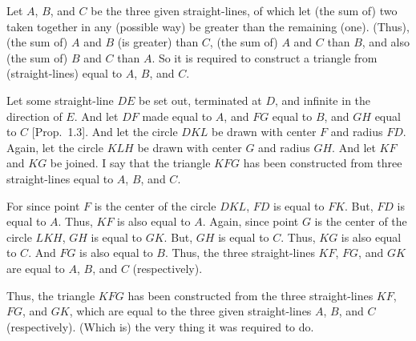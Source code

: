 \begin{Parallel}{}{}
{\epsfysize=2.3in
\centerline{}

Let $A$, $B$, and $C$ be the three given straight-lines, of which let (the sum of) two taken together in any (possible way)
be greater than the remaining (one). (Thus), (the sum of) $A$ and $B$ (is greater) than $C$, (the sum of) $A$ and $C$ than $B$,
and also (the sum of) $B$ and $C$ than $A$. So it is required to construct a triangle
from (straight-lines) equal to $A$, $B$, and $C$.

Let some straight-line $DE$ be set out, terminated at $D$, and infinite in the
direction of $E$.  And let $DF$ made equal to $A$, and $FG$
equal to $B$, and $GH$ equal to $C$ [Prop.~1.3]. And let the
circle $DKL$ be drawn with center $F$ and radius $FD$. Again,
let the circle $KLH$ be drawn with center $G$ and radius $GH$. And
let $KF$ and $KG$ be joined. I say that the triangle $KFG$ has been
constructed from three straight-lines equal to $A$, $B$, and $C$.

For since point $F$ is the center of the circle $DKL$, $FD$ is equal to $FK$.
But, $FD$ is equal to $A$. Thus, $KF$ is also equal to $A$. Again, since point
$G$ is the center of the circle $LKH$, $GH$ is equal to $GK$. But, $GH$ is equal
to $C$. Thus, $KG$ is also equal to $C$. And $FG$ is also equal to $B$. Thus,
the three straight-lines $KF$, $FG$, and $GK$ are equal to $A$, $B$, and $C$ (respectively).

Thus, the triangle $KFG$ has been constructed from the three straight-lines
$KF$, $FG$, and $GK$, which are equal to the three given straight-lines
$A$, $B$, and $C$ (respectively). (Which is) the very thing it was required
to do.}
\end{Parallel}

